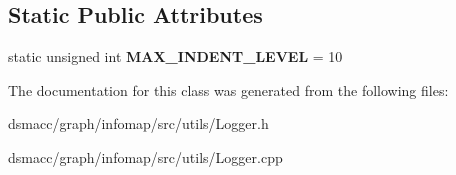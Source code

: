 \subsection*{Static Public Attributes}
\begin{DoxyCompactItemize}
\item 
\mbox{\label{classLogger_a0c34b941500235016fdb8358553587b5}} 
static unsigned int {\bfseries M\+A\+X\+\_\+\+I\+N\+D\+E\+N\+T\+\_\+\+L\+E\+V\+EL} = 10
\end{DoxyCompactItemize}


The documentation for this class was generated from the following files\+:\begin{DoxyCompactItemize}
\item 
dsmacc/graph/infomap/src/utils/Logger.\+h\item 
dsmacc/graph/infomap/src/utils/Logger.\+cpp\end{DoxyCompactItemize}
